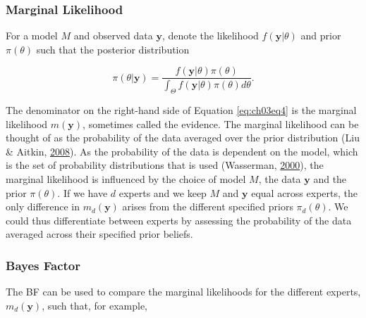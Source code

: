\documentclass[openright,titlepage,12pt,a4paper]{book}
\begin{document}
\hypertarget{marginal-likelihood}{%
\subsubsection{Marginal Likelihood}\label{marginal-likelihood}}

For a model \(M\) and observed data \(\textbf{y}\), denote the likelihood \(f(\textbf{y}|\theta)\) and prior \(\pi(\theta)\) such that the posterior distribution

\begin{equation} 
\pi(\theta|\textbf{y}) = \frac{f(\textbf{y}|\theta)\pi(\theta)}{\int_{\Theta}f(\textbf{y}|\theta)\pi(\theta)d\theta}.
\label{eq:ch03eq4}
\end{equation}

The denominator on the right-hand side of Equation \eqref{eq:ch03eq4} is the marginal likelihood \(m(\textbf{y})\), sometimes called the evidence. The marginal likelihood can be thought of as the probability of the data averaged over the prior distribution (Liu \& Aitkin, \protect\hyperlink{ref-liu_bayes_2008}{2008}). As the probability of the data is dependent on the model, which is the set of probability distributions that is used (Wasserman, \protect\hyperlink{ref-wasserman_bayesian_2000}{2000}), the marginal likelihood is influenced by the choice of model \(M\), the data \(\textbf{y}\) and the prior \(\pi(\theta)\). If we have \(d\) experts and we keep \(M\) and \(\textbf{y}\) equal across experts, the only difference in \(m_d(\textbf{y})\) arises from the different specified priors \(\pi_d(\theta)\). We could thus differentiate between experts by assessing the probability of the data averaged across their specified prior beliefs.

\hypertarget{bayes-factor}{%
\subsubsection{Bayes Factor}\label{bayes-factor}}

The BF can be used to compare the marginal likelihoods for the different experts, \(m_d(\textbf{y})\), such that, for example,
\end{document}
